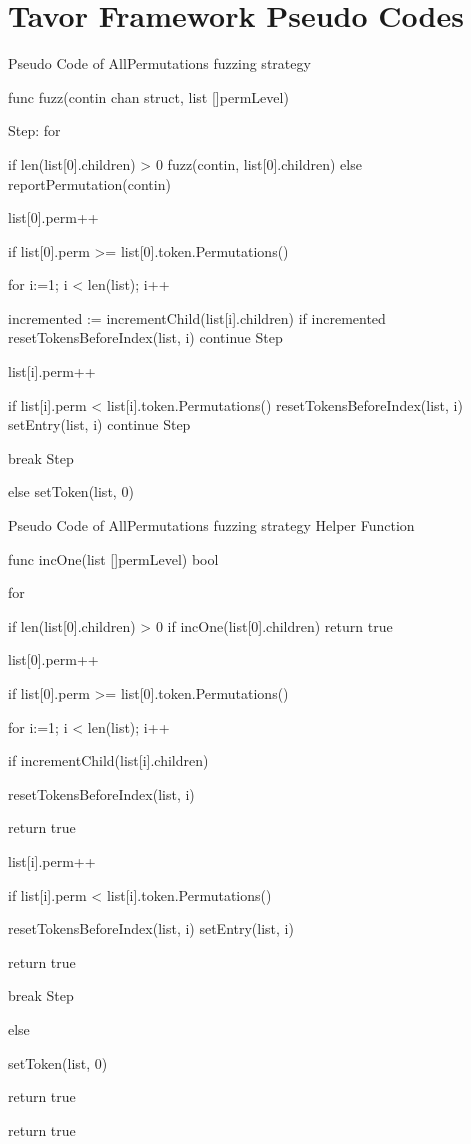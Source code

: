 \appendix

\chapter{Tavor Framework Pseudo Codes}
\label{chapter:AppendixTavorFramework}

\begin{listing}
\caption{Pseudo Code of AllPermutations fuzzing strategy}
\label{lst:pseudo-code-all-perm-strat}
\begin{gocode}
func fuzz(contin chan struct{}, list []permLevel) {
Step:
	for {
		if len(list[0].children) > 0 {
			fuzz(contin, list[0].children)
		} else {
			reportPermutation(contin)
		}

		list[0].perm++

		if list[0].perm >= list[0].token.Permutations(){
			for i:=1; i < len(list); i++ {
				incremented := incrementChild(list[i].children)
				if incremented {
					resetTokensBeforeIndex(list, i)
					continue Step
				}

				list[i].perm++

				if list[i].perm < list[i].token.Permutations() {
					resetTokensBeforeIndex(list, i)
					setEntry(list, i)
					continue Step
				}
			}
			break Step
		} else {
			setToken(list, 0)
		}
	}
}
\end{gocode}
\end{listing}

\begin{listing}
\caption{Pseudo Code of AllPermutations fuzzing strategy Helper Function}
\label{lst:pseudo-code-all-perm-strat-helper}
\begin{gocode}
func incOne(list []permLevel) bool {
	for {
		if len(list[0].children) > 0 {
			if incOne(list[0].children) {
				return true
			}
		}

		list[0].perm++

		if list[0].perm >= list[0].token.Permutations(){
			for i:=1; i < len(list); i++ {
				if incrementChild(list[i].children) {
					resetTokensBeforeIndex(list, i)

					return true
				}

				list[i].perm++

				if list[i].perm < list[i].token.Permutations() {
					resetTokensBeforeIndex(list, i)
					setEntry(list, i)

					return true
				}
			}
			break Step
		} else {
			setToken(list, 0)

			return true
		}
	}

	return true
}
\end{gocode}
\end{listing}


